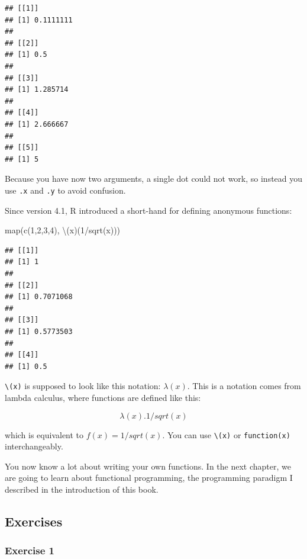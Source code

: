 \documentclass[
]{article}
\newenvironment{Shaded}{\begin{snugshade}}{\end{snugshade}}
\newcommand{\DecValTok}[1]{\textcolor[rgb]{0.00,0.00,0.81}{#1}}
\newcommand{\FunctionTok}[1]{\textcolor[rgb]{0.00,0.00,0.00}{#1}}
\newcommand{\NormalTok}[1]{#1}
\newcommand{\SpecialCharTok}[1]{\textcolor[rgb]{0.00,0.00,0.00}{#1}}
\begin{document}
\begin{verbatim}
## [[1]]
## [1] 0.1111111
## 
## [[2]]
## [1] 0.5
## 
## [[3]]
## [1] 1.285714
## 
## [[4]]
## [1] 2.666667
## 
## [[5]]
## [1] 5
\end{verbatim}

Because you have now two arguments, a single dot could not work, so instead you use \texttt{.x} and \texttt{.y} to
avoid confusion.

Since version 4.1, R introduced a short-hand for defining anonymous functions:

\begin{Shaded}
\begin{Highlighting}[]
\FunctionTok{map}\NormalTok{(}\FunctionTok{c}\NormalTok{(}\DecValTok{1}\NormalTok{,}\DecValTok{2}\NormalTok{,}\DecValTok{3}\NormalTok{,}\DecValTok{4}\NormalTok{), \textbackslash{}(x)(}\DecValTok{1}\SpecialCharTok{/}\FunctionTok{sqrt}\NormalTok{(x)))}
\end{Highlighting}
\end{Shaded}

\begin{verbatim}
## [[1]]
## [1] 1
## 
## [[2]]
## [1] 0.7071068
## 
## [[3]]
## [1] 0.5773503
## 
## [[4]]
## [1] 0.5
\end{verbatim}

\texttt{\textbackslash{}(x)} is supposed to look like this notation: \(\lambda(x)\). This is a notation comes from lambda calculus, where functions
are defined like this:

\[
\lambda(x).1/sqrt(x)
\]

which is equivalent to \(f(x) = 1/sqrt(x)\). You can use \texttt{\textbackslash{}(x)} or \texttt{function(x)} interchangeably.

You now know a lot about writing your own functions. In the next chapter, we are going to learn
about functional programming, the programming paradigm I described in the introduction of this
book.

\hypertarget{exercises-5}{%
\subsection{Exercises}\label{exercises-5}}

\hypertarget{exercise-1-5}{%
\subsubsection*{Exercise 1}\label{exercise-1-5}}
\end{document}
